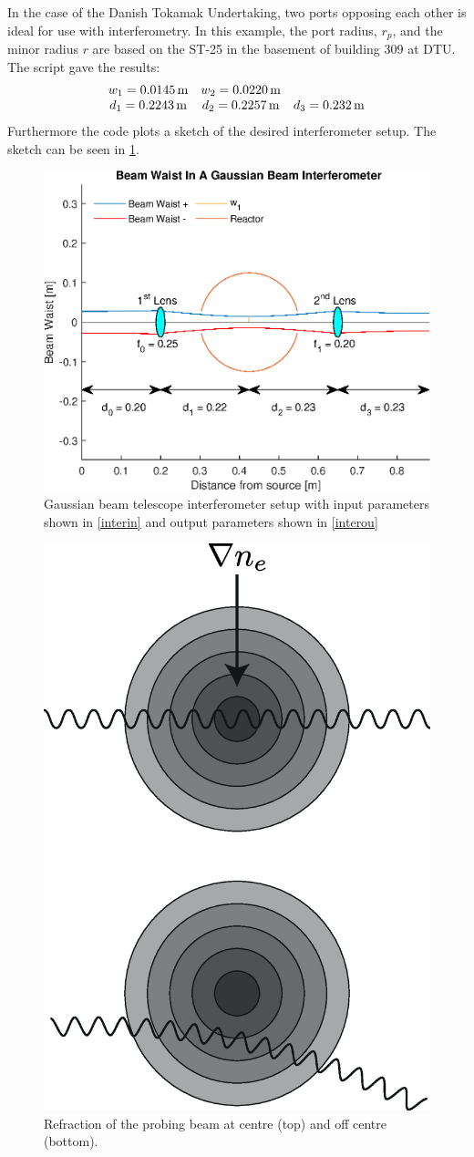 In the case of the Danish Tokamak Undertaking, two ports opposing each other is ideal for use with interferometry. In this example, the port radius, \(r_p\), and the minor radius \(r\) are based on the ST-25 in the basement of building 309 at DTU.
The script gave the results:
\begin{align}
	\mqty{w_1 = \SI{0.0145}{\meter} & w_2 = \SI{0.0220}{\meter}                                            \\
	d_1 = \SI{0.2243}{\meter}       & d_2 = \SI{0.2257}{\meter} & d_3 = \SI{0.232}{\meter}}\label{interou}
\end{align}
Furthermore the code plots a sketch of the desired interferometer setup. The sketch can be seen in \cref{AWESOME}.\newline
\begin{figure}
	\centering
	\includegraphics[width=.7\textwidth]{MatlabFigures/Interferometer/Interferometer.eps}
	\caption{Gaussian beam telescope interferometer setup with input parameters shown in \cref{interin} and output parameters shown in \cref{interou}}
	\label{AWESOME}
\end{figure}
\begin{figure}
	\centering
	\includegraphics[width=.3\textwidth]{Figures/Refraction.eps}
	\caption{Refraction of the probing beam at centre  (top) and off centre (bottom).}
	\label{Refrac}
\end{figure}

